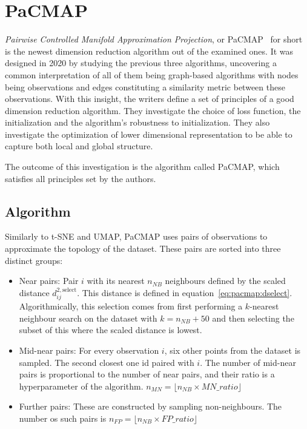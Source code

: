 \section{PaCMAP}\label{sec:pacmap}

\textit{Pairwise Controlled Manifold Approximation Projection}, or PaCMAP~\cite{bib:pacmap} for short is the newest dimension reduction algorithm out of the examined ones. It was designed in 2020 by studying the previous three algorithms, uncovering a common interpretation of all of them being graph-based algorithms with nodes being observations and edges constituting a similarity metric between these observations. With this insight, the writers define a set of principles of a good dimension reduction algorithm. They investigate the choice of loss function, the initialization and the algorithm's robustness to initialization. They also investigate the optimization of lower dimensional representation to be able to capture both local and global structure.

The outcome of this investigation is the algorithm called PaCMAP, which satisfies all principles set by the authors. 

\subsection{Algorithm}

Similarly to t-SNE and UMAP, PaCMAP uses pairs of observations to approximate the topology of the dataset. These pairs are sorted into three distinct groups:

\begin{itemize}
	\item Near pairs: Pair $i$ with its nearest $n_{NB}$ neighbours defined by the scaled distance $d^{2,\textrm{select}}_{ij}$. This distance is defined in equation~\eqref{eq:pacmap:dselect}. Algorithmically, this selection comes from first performing a $k$-nearest neighbour search on the dataset with $k = n_{NB} + 50$ and then selecting the subset of this where the scaled distance is lowest.
	\item Mid-near pairs: For every observation $i$, six other points from the dataset is sampled. The second closest one id paired with $i$. The number of mid-near pairs is proportional to the number of near pairs, and their ratio is a hyperparameter of the algorithm. $n_{MN} = \lfloor n_{NB} \times MN\_ratio\rfloor$
	\item Further pairs: These are constructed by sampling non-neighbours. The number os such pairs is $n_{FP} = \lfloor n_{NB} \times FP\_ratio \rfloor$
\end{itemize}

